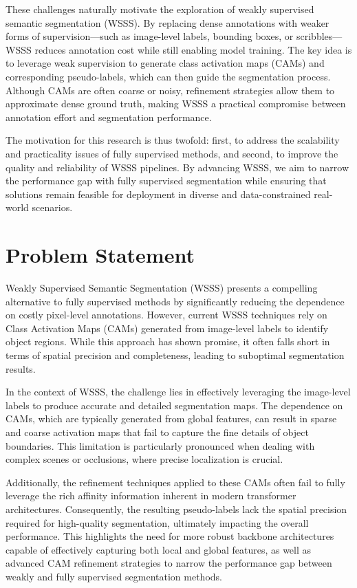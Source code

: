 These challenges naturally motivate the exploration of weakly supervised semantic segmentation (WSSS). By replacing dense annotations with weaker forms of supervision—such as image-level labels, bounding boxes, or scribbles—WSSS reduces annotation cost while still enabling model training. The key idea is to leverage weak supervision to generate class activation maps (CAMs) and corresponding pseudo-labels, which can then guide the segmentation process. Although CAMs are often coarse or noisy, refinement strategies allow them to approximate dense ground truth, making WSSS a practical compromise between annotation effort and segmentation performance.

The motivation for this research is thus twofold: first, to address the scalability and practicality issues of fully supervised methods, and second, to improve the quality and reliability of WSSS pipelines. By advancing WSSS, we aim to narrow the performance gap with fully supervised segmentation while ensuring that solutions remain feasible for deployment in diverse and data-constrained real-world scenarios.



\section{Problem Statement}
\label{sec:problem_statement}

Weakly Supervised Semantic Segmentation (WSSS) presents a compelling alternative to fully supervised methods by significantly reducing the dependence on costly pixel-level annotations. However, current WSSS techniques rely on Class Activation Maps (CAMs) \cite{cam} generated from image-level labels to identify object regions. While this approach has shown promise, it often falls short in terms of spatial precision and completeness, leading to suboptimal segmentation results.

In the context of WSSS, the challenge lies in effectively leveraging the image-level labels to produce accurate and detailed segmentation maps. The dependence on CAMs, which are typically generated from global features, can result in sparse and coarse activation maps that fail to capture the fine details of object boundaries. This limitation is particularly pronounced when dealing with complex scenes or occlusions, where precise localization is crucial.

Additionally, the refinement techniques applied to these CAMs often fail to fully leverage the rich affinity information inherent in modern transformer architectures. Consequently, the resulting pseudo-labels lack the spatial precision required for high-quality segmentation, ultimately impacting the overall performance. This highlights the need for more robust backbone architectures capable of effectively capturing both local and global features, as well as advanced CAM refinement strategies to narrow the performance gap between weakly and fully supervised segmentation methods.

